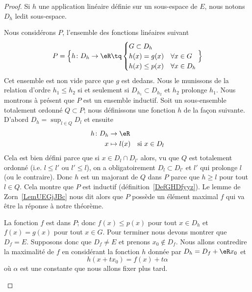 \begin{proof}
	Si \( h\) une application linéaire définie sur un sous-espace de \( E\), nous notons \( D_h\) ledit sous-espace.

	\begin{subproof}

		Nous considérons \( P\), l'ensemble des fonctions linéaires suivant
		\begin{equation}
			P=\Big\{  h\colon D_h\to \eR\tq
			\begin{cases}
				G\subset D_h                     \\
				h(x)=g(x)     & \forall x\in G   \\
				h(x)\leq p(x) & \forall x\in D_h
			\end{cases}
			\Big\}
		\end{equation}
		Cet ensemble est non vide parce que \( g\) est dedans. Nous le munissons de la relation d'ordre \( h_1\leq h_2\) si et seulement si \( D_{h_1}\subset D_{h_2}\) et \( h_2\) prolonge \( h_1\). Nous montrons à présent que \( P\) est un ensemble inductif. Soit un sous-ensemble totalement ordonné \( Q\subset P\); nous définissons une fonction \( h\) de la façon suivante. D'abord \( D_h=\sup_{l\in Q}D_l\) et ensuite
		\begin{equation}
			\begin{aligned}
				h\colon D_h & \to \eR                            \\
				x           & \mapsto l(x) & \text{si } x\in D_l
			\end{aligned}
		\end{equation}
		Cela est bien défini parce que si \( x\in D_l\cap D_{l'}\) alors, vu que \( Q\) est totalement ordonné (i.e. \( l\leq l'\) ou \( l'\leq l\)), on a obligatoirement \( D_l\subset D_{l'}\) et \( l'\) qui prolonge \( l\) (ou le contraire). Donc \( h\) est un majorant de \( Q\) dans \( P\) parce que \( h\geq l\) pour tout \( l\in Q\). Cela montre que \( P\) est inductif (définition~\ref{DefGHDfyyz}). Le lemme de Zorn~\ref{LemUEGjJBc} nous dit alors que \( P\) possède un élément maximal \( f\) qui va être la réponse à notre théorème.

		\spitem[Le support de \( f\)]

		La fonction \( f\) est dans \( P\); donc \( f(x)\leq p(x)\) pour tout \( x\in D_h\) et \( f(x)=g(x)\) pour tout \( x\in G\). Pour terminer nous devons montrer que \( D_f=E\). Supposons donc que \( D_f\neq E\) et prenons \( x_0\notin D_f\). Nous allons contredire la maximalité de \( f\) en considérant la fonction \( h\) donnée par \( D_h=D_f+\eR x_0 \) et
		\begin{equation}
			h(x+tx_0)=f(x)+t\alpha
		\end{equation}
		où \( \alpha\) est une constante que nous allons fixer plus tard.


\end{subproof}
\end{proof}
